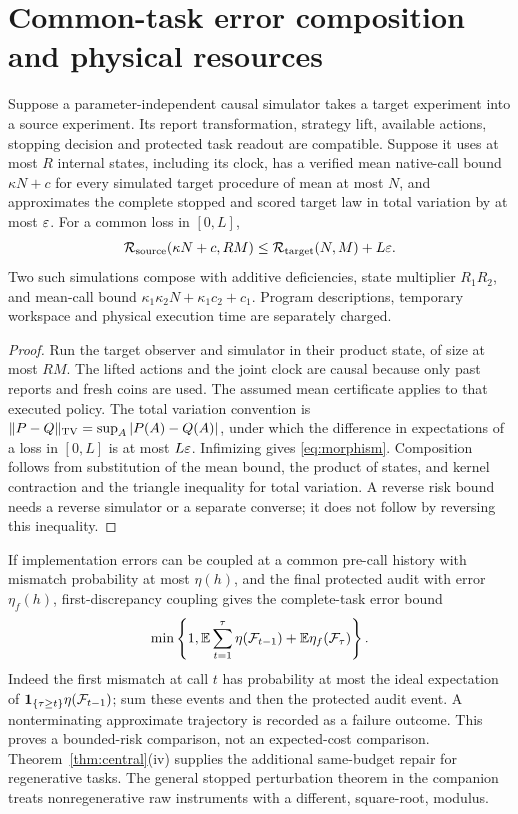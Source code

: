 \section{Common-task error composition and physical resources}\label{sec:errors}
\begin{proposition}\label{prop:simulation}
Suppose a parameter-independent causal simulator takes a target experiment into a source experiment. Its report transformation, strategy lift, available actions, stopping decision and protected task readout are compatible. Suppose it uses at most $R$ internal states, including its clock, has a verified mean native-call bound $\kappa N+c$ for every simulated target procedure of mean at most $N$, and approximates the complete stopped and scored target law in total variation by at most $\varepsilon$. For a common loss in $[0,L]$,
\begin{equation}\label{eq:morphism}
 \mathcal R_{\rm source}(\kappa N+c,RM)
 \le \mathcal R_{\rm target}(N,M)+L\varepsilon.
\end{equation}
Two such simulations compose with additive deficiencies, state multiplier $R_1R_2$, and mean-call bound $\kappa_1\kappa_2N+\kappa_1c_2+c_1$. Program descriptions, temporary workspace and physical execution time are separately charged.
\end{proposition}
\begin{proof}
Run the target observer and simulator in their product state, of size at most $RM$. The lifted actions and the joint clock are causal because only past reports and fresh coins are used. The assumed mean certificate applies to that executed policy. The total variation convention is $\lVert P-Q\rVert_{\mathrm{TV}}=\sup_A|P(A)-Q(A)|$, under which the difference in expectations of a loss in $[0,L]$ is at most $L\varepsilon$. Infimizing gives \eqref{eq:morphism}. Composition follows from substitution of the mean bound, the product of states, and kernel contraction and the triangle inequality for total variation. A reverse risk bound needs a reverse simulator or a separate converse; it does not follow by reversing this inequality.
\end{proof}

If implementation errors can be coupled at a common pre-call history with mismatch probability at most $\eta(h)$, and the final protected audit with error $\eta_f(h)$, first-discrepancy coupling gives the complete-task error bound
\begin{equation}\label{eq:stopped-coupling}
 \min\left\{1,\mathbb E\sum_{t=1}^{\tau}\eta(\mathcal F_{t-1})+\mathbb E\eta_f(\mathcal F_\tau)\right\}.
\end{equation}
Indeed the first mismatch at call $t$ has probability at most the ideal expectation of $\mathbf1_{\{\tau\ge t\}}\eta(\mathcal F_{t-1})$; sum these events and then the protected audit event. A nonterminating approximate trajectory is recorded as a failure outcome. This proves a bounded-risk comparison, not an expected-cost comparison. Theorem~\ref{thm:central}\textup{(iv)} supplies the additional same-budget repair for regenerative tasks. The general stopped perturbation theorem in the companion~\cite{GTF49} treats nonregenerative raw instruments with a different, square-root, modulus.

